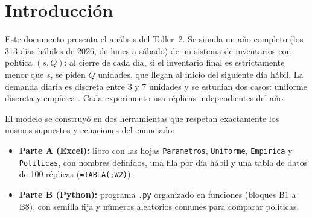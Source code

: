 
\newcommand{\histograma}[3]{%
\begin{tikzpicture}
\begin{axis}[
  ybar interval, width=0.95\linewidth, height=5.6cm, ymin=0,
  title={\small #2},
  xlabel={\footnotesize Ganancia anual (millones de COP)},
  ylabel={\footnotesize Frecuencia (réplicas)},
  x tick label style={font=\scriptsize, rotate=40, anchor=north east,
    /pgf/number format/.cd, fixed, precision=1, use comma, 1000 sep={}},
  y tick label style={font=\scriptsize},
  xtick=data, grid=major, grid style={gray!25}]
\edef\histtmp{\noexpand\addplot[fill=#3, draw=black] coordinates {#1};}\histtmp
\end{axis}
\end{tikzpicture}}

\section{Introducción}

Este documento presenta el análisis del Taller~2. Se simula un año completo (los 313 días
hábiles de 2026, de lunes a sábado) de un sistema de inventarios con política $(s,Q)$: al cierre
de cada día, si el inventario final es estrictamente menor que $s$, se piden $Q$ unidades, que
llegan al inicio del siguiente día hábil. La demanda diaria es discreta entre 3 y 7 unidades y
se estudian dos casos: uniforme discreta y empírica \cite{eafit2026}. Cada experimento usa \nReplicas{} réplicas
independientes del año.

El modelo se construyó en dos herramientas que respetan exactamente los mismos supuestos y
ecuaciones del enunciado:

\begin{itemize}
  \item \textbf{Parte A (Excel):} libro con las hojas \texttt{Parametros}, \texttt{Uniforme},
  \texttt{Empirica} y \texttt{Politicas}, con nombres definidos, una fila por día hábil y una tabla
  de datos de 100 réplicas (\texttt{=TABLA(;W2)}).
  \item \textbf{Parte B (Python):} programa \texttt{.py} organizado en funciones (bloques B1 a B8),
  con semilla fija \semilla{} y números aleatorios comunes para comparar políticas.
\end{itemize}

